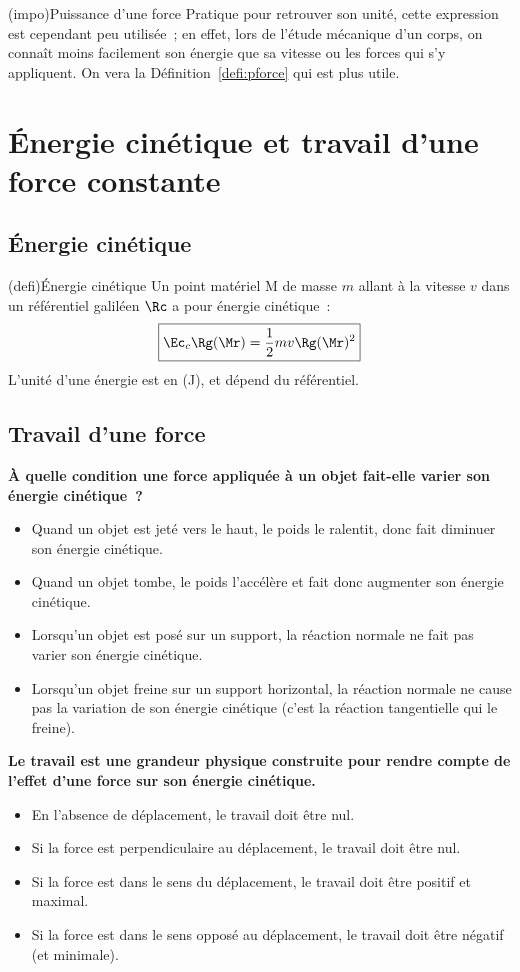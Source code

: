 \documentclass[../../main/main.tex]{subfiles}
\begin{document}
\begin{tcb*}(impo){Puissance d'une force}
	Pratique pour retrouver son unité, cette expression est cependant peu
	utilisée~; en effet, lors de l'étude mécanique d'un corps, on connaît moins
	facilement son énergie que sa vitesse ou les forces qui s'y appliquent. On
	vera la Définition~\ref{defi:pforce} qui est plus utile.
\end{tcb*}

\vspace{-10pt}
\section{Énergie cinétique et travail d'une force constante}
\subsection{Énergie cinétique}

\begin{tcb*}[sidebyside](defi){Énergie cinétique}
	Un point matériel M de masse $m$ allant à la vitesse $v$ dans un référentiel
	galiléen $\Rc$ a pour énergie cinétique~:
	\[\boxed{\Ec_{c}\Rg(\Mr) = \frac{1}{2}mv\Rg(\Mr)^2}\]
	\tcblower
	L'unité d'une énergie est en  (J), et dépend du référentiel.
\end{tcb*}

\subsection{Travail d'une force}

\textbf{À quelle condition une force appliquée à un objet fait-elle varier son
	énergie cinétique~?}
\begin{itemize}
	\item Quand un objet est jeté vers le haut, le poids le ralentit, donc fait
	      diminuer son énergie cinétique.
	\item Quand un objet tombe, le poids l’accélère et fait donc augmenter son
	      énergie cinétique.
	\item Lorsqu’un objet est posé sur un support, la réaction normale ne fait
	      pas varier son énergie cinétique.
	\item Lorsqu’un objet freine sur un support horizontal, la réaction normale
	      ne cause pas la variation de son énergie cinétique (c’est la réaction
	      tangentielle qui le freine).
\end{itemize}
\textbf{Le travail est une grandeur physique construite pour rendre compte de
	l’effet d’une force sur son énergie cinétique.}
\begin{itemize}
	\item En l’absence de déplacement, le travail doit être nul.
	\item Si la force est perpendiculaire au déplacement, le travail doit être
	      nul.
	\item Si la force est dans le sens du déplacement, le travail doit être
	      positif et maximal.
	\item Si la force est dans le sens opposé au déplacement, le travail doit
	      être négatif (et minimale).
\end{itemize}
\end{document}
